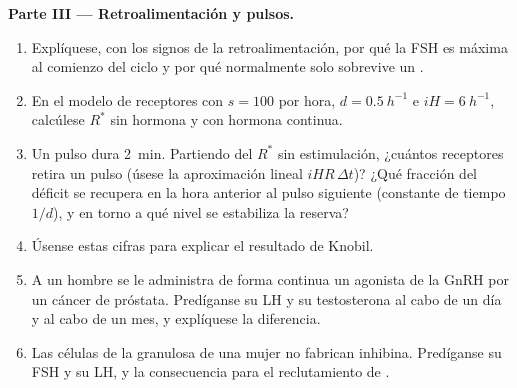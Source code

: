 \begin{problem}
\medskip
\noindent\textbf{Parte III --- Retroalimentación y pulsos.}
\begin{enumerate}[resume]
  \item Explíquese, con los signos de la retroalimentación, por qué la FSH
        es máxima al comienzo del ciclo y por qué normalmente solo
        sobrevive un .
  \item En el modelo de receptores con $s = 100$ por hora, $d =
        \qty{0.5}{h^{-1}}$ e $iH = \qty{6}{h^{-1}}$, calcúlese $R^*$ sin
        hormona y con hormona continua.
  \item Un pulso dura \qty{2}{min}. Partiendo del $R^*$ sin estimulación,
        ¿cuántos receptores retira un pulso (úsese la aproximación lineal
        $iHR\,\Delta t$)? ¿Qué fracción del déficit se recupera en la hora
        anterior al pulso siguiente (constante de tiempo $1/d$), y en torno
        a qué nivel se estabiliza la reserva?
  \item Úsense estas cifras para explicar el resultado de Knobil.
  \item A un hombre se le administra de forma continua un agonista de la
        GnRH por un cáncer de próstata. Predíganse su LH y su testosterona
        al cabo de un día y al cabo de un mes, y explíquese la
        diferencia.
  \item Las células de la granulosa de una mujer no fabrican inhibina.
        Predíganse su FSH y su LH, y la consecuencia para el reclutamiento
        de .
\end{enumerate}


\end{problem}
